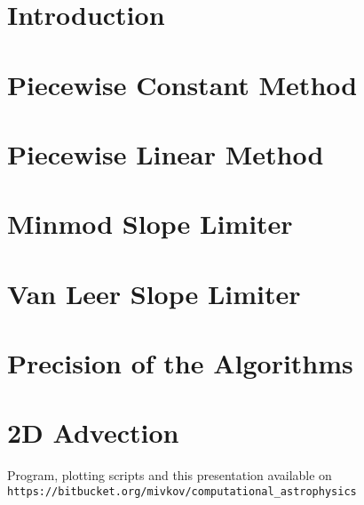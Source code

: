 \begin{frame}{}
	\titlepage
\end{frame}



\section{Introduction}




\section{Piecewise Constant Method}




\section{Piecewise Linear Method}




\section{Minmod Slope Limiter}




\section{Van Leer Slope Limiter}




\section{Precision of the Algorithms}




\section{2D Advection}









\begin{frame}[fragile]
	Program, plotting scripts and this presentation available on \verb!https://bitbucket.org/mivkov/computational_astrophysics!
\end{frame}












